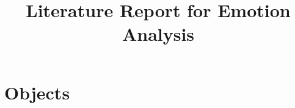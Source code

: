 \documentclass[12pt]{extarticle}
\title{Literature Report for Emotion Analysis}
\author{ }
\date{}
\begin{document}
\maketitle

\section{Objects}




\end{document}
